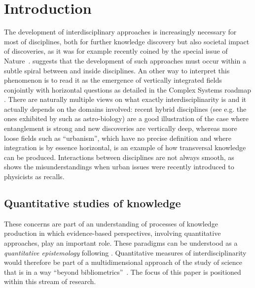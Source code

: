 \section*{Introduction}
\label{sec:intro}



The development of interdisciplinary approaches is increasingly necessary for most of disciplines, both for further knowledge discovery but also societal impact of discoveries, as it was for example recently coined by the special issue of Nature~\citep{natureInterdisc}.  \cite{banos2013pour} suggests that the development of such approaches must occur within a subtle spiral between and inside disciplines. An other way to interpret this phenomenon is to read it as the emergence of vertically integrated fields conjointly with horizontal questions as detailed in the Complex Systems roadmap \citep{2009arXiv0907.2221B}. There are naturally multiple views on what exactly interdisciplinarity is and it actually depends on the domains involved: recent hybrid disciplines (see e.g. the ones exhibited by \cite{bais2010praise} such as astro-biology) are a good illustration of the case where entanglement is strong and new discoveries are vertically deep, whereas more loose fields such as ``urbanism'', which have no precise definition and where integration is by essence horizontal, is an example of how transversal knowledge can be produced. Interactions between disciplines are not always smooth, as shows the misunderstandings when urban issues were recently introduced to physicists as \cite{dupuy2015sciences} recalls.


\subsection*{Quantitative studies of knowledge}

These concerns are part of an understanding of processes of knowledge production in which evidence-based perspectives, involving quantitative approaches, play an important role. These paradigms can be understood as a \emph{quantitative epistemology} following \cite{chavalarias2013phylomemetic}. Quantitative measures of interdisciplinarity would therefore be part of a multidimensional approach of the study of science that is in a way ``beyond bibliometrics''~\citep{cronin2014beyond}.
The focus of this paper is positioned within this stream of research.

